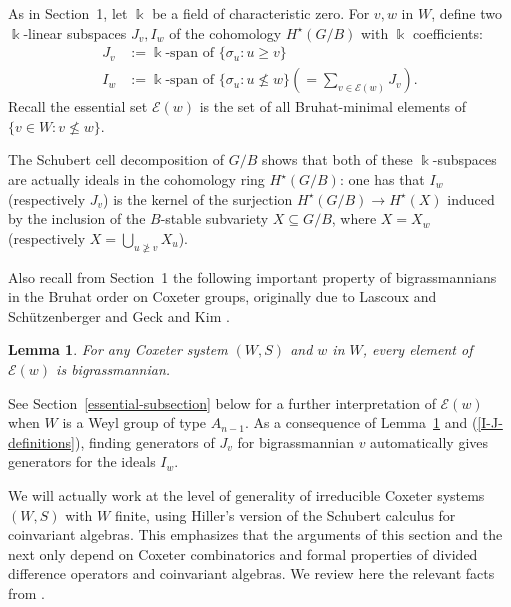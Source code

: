 \documentclass[12pt,dvips]{amsart}
\theoremstyle{plain}
\newtheorem{lemma}[theorem]{Lemma}
\theoremstyle{definition}
\newtheorem{definition}[theorem]{Definition}
\theoremstyle{remark}
\numberwithin{equation}{section}
\def\Ess{{\mathcal{E}}}
\begin{document}
As in Section~1, let $\Bbbk$ be a field of characteristic zero.
For $v,w$ in $W$, define two $\Bbbk$-linear subspaces $J_v, I_w$ of the cohomology
$H^\star(G/B)$ with $\Bbbk$ coefficients:
\begin{equation}
\label{I-J-definitions}
\begin{aligned}
J_v&:=\Bbbk\text{-span of }\{ \sigma_u: u \geq v \}\\
I_w&:=\Bbbk\text{-span of }\{ \sigma_u: u \not\leq w\} 
\left(=\sum_{v \in \Ess(w)} J_v\right).
\end{aligned}
\end{equation}
Recall the essential set $\Ess(w)$ is the 
set of all Bruhat-minimal elements of $\{v \in W:  v \not\leq w\}$.

The Schubert cell decomposition of $G/B$ shows that both of these 
$\Bbbk$-subspaces
are actually ideals in the cohomology ring $H^\star(G/B)$:  one has that
$I_w$ (respectively $J_v$) is
the kernel of the surjection $H^\star(G/B) \rightarrow H^\star(X)$ 
induced by the inclusion of the
$B$-stable subvariety $X \subseteq G/B$, where $X=X_w$ (respectively
$X= \bigcup_{u \not\geq v} X_u$).

Also recall from Section~1 the following important property of
bigrassmannians in the Bruhat order on Coxeter groups, originally due
to Lascoux and Sch\"utzenberger \cite[Th\'eor\`eme
3.6]{LascouxSchutzenberger} and Geck and Kim \cite[Lemma 2.3 and
Theorem 2.5]{GeckKim}.

\begin{lemma}
\label{bigrassmannian-fact}
For any Coxeter system $(W,S)$ and $w$ in $W$, every element of
$\Ess(w)$ is bigrassmannian.
\end{lemma}

\noindent
See Section~\ref{essential-subsection} below for a further
interpretation of $\Ess(w)$ when $W$ is a Weyl group of type
$A_{n-1}$.  As a consequence of Lemma~\ref{bigrassmannian-fact} and
(\ref{I-J-definitions}), finding generators of $J_v$ for
bigrassmannian $v$ automatically gives generators for the ideals $I_w$.

We will actually work at the level of generality of irreducible
Coxeter systems $(W,S)$ with $W$ finite, using Hiller's version
\cite{Hiller} of the Schubert calculus \cite{BGG, Demazure} for
coinvariant algebras. This emphasizes that the arguments of this
section and the next only depend on Coxeter combinatorics and formal
properties of divided difference operators and coinvariant
algebras.  We review here the relevant facts from \cite[Chapter
IV]{Hiller}.
\end{document}
